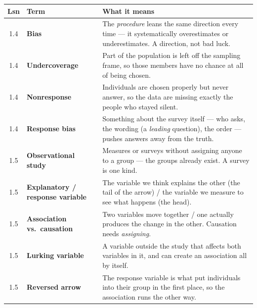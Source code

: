 \documentclass[10pt]{article}
\begin{document}
\vspace{4pt}
\boxguard[14]
\begin{tabularx}{\linewidth}{@{} c >{\raggedright\arraybackslash\bfseries}p{3.5cm} X @{}}
\rowcolor{frost}
\textbf{Lsn} & \textbf{Term} & \textbf{What it means} \\
\midrule
1.4 & Bias & The \emph{procedure} leans the same direction every time --- it
      systematically overestimates or underestimates. A direction, not bad luck. \\
1.4 & Undercoverage & Part of the population is left off the sampling frame, so
      those members have no chance at all of being chosen. \\
1.4 & Nonresponse & Individuals are chosen properly but never answer, so the data
      are missing exactly the people who stayed silent. \\
1.4 & Response bias & Something about the survey itself --- who asks, the wording
      (a \emph{leading} question), the order --- pushes answers away from the truth. \\
1.5 & Observational study & Measures or surveys without assigning anyone to a group
      --- the groups already exist. A survey is one kind. \\
1.5 & Explanatory / response variable & The variable we think explains the other
      (the tail of the arrow) / the variable we measure to see what happens (the head). \\
1.5 & Association vs.\ causation & Two variables move together / one actually
      produces the change in the other. Causation needs \emph{assigning}. \\
1.5 & Lurking variable & A variable outside the study that affects both variables in
      it, and can create an association all by itself. \\
1.5 & Reversed arrow & The response variable is what put individuals into their
      group in the first place, so the association runs the other way. \\
\end{tabularx}
\end{document}
